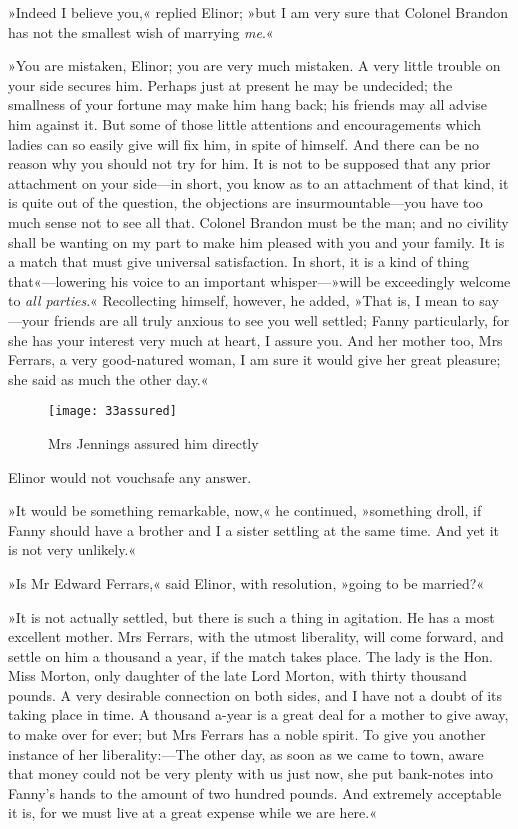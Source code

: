 »Indeed I believe you,« replied Elinor; »but I am very sure that Colonel Brandon has not the smallest wish of marrying \textit{me}.«

»You are mistaken, Elinor; you are very much mistaken. A very little trouble on your side secures him. Perhaps just at present he may be undecided; the smallness of your fortune may make him hang back; his friends may all advise him against it. But some of those little attentions and encouragements which ladies can so easily give will fix him, in spite of himself. And there can be no reason why you should not try for him. It is not to be supposed that any prior attachment on your side—in short, you know as to an attachment of that kind, it is quite out of the question, the objections are insurmountable—you have too much sense not to see all that. Colonel Brandon must be the man; and no civility shall be wanting on my part to make him pleased with you and your family. It is a match that must give universal satisfaction. In short, it is a kind of thing that«—lowering his voice to an important whisper—»will be exceedingly welcome to \textit{all parties}.« Recollecting himself, however, he added, »That is, I mean to say—your friends are all truly anxious to see you well settled; Fanny particularly, for she has your interest very much at heart, I assure you. And her mother too, Mrs Ferrars, a very good-natured woman, I am sure it would give her great pleasure; she said as much the other day.«

\begin{figure}[tbph]
\centering
\texttt{[image: 33assured]}
\caption{Mrs Jennings assured him directly}
\end{figure}

Elinor would not vouchsafe any answer.

»It would be something remarkable, now,« he continued, »something droll, if Fanny should have a brother and I a sister settling at the same time. And yet it is not very unlikely.«

»Is Mr Edward Ferrars,« said Elinor, with resolution, »going to be married?«

»It is not actually settled, but there is such a thing in agitation. He has a most excellent mother. Mrs Ferrars, with the utmost liberality, will come forward, and settle on him a thousand a year, if the match takes place. The lady is the Hon. Miss Morton, only daughter of the late Lord Morton, with thirty thousand pounds. A very desirable connection on both sides, and I have not a doubt of its taking place in time. A thousand a-year is a great deal for a mother to give away, to make over for ever; but Mrs Ferrars has a noble spirit. To give you another instance of her liberality:—The other day, as soon as we came to town, aware that money could not be very plenty with us just now, she put bank-notes into Fanny’s hands to the amount of two hundred pounds. And extremely acceptable it is, for we must live at a great expense while we are here.«

